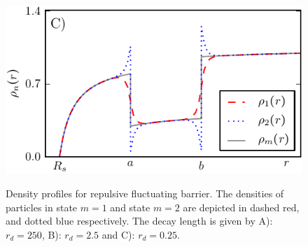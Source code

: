 \begin{minipage}[t]{0.5 \textwidth}
    \begin{figure}[H]
        \includegraphics[width = 1 \textwidth]{plots/d3.pdf}
    \end{figure}
\end{minipage}\hspace{0.07\textwidth}\begin{minipage}[t]{0.43 \textwidth}
    \begin{figure}[H]
        \caption{Density profiles for repulsive fluctuating barrier. The densities of particles in state $m=1$ and state $m=2$ are depicted in dashed red, and dotted blue respectively. The decay length is given by A): $r_d = 250$, \newline B): $r_d=2.5$ and C): $r_d=0.25$. \label{rsd}}
    \end{figure}
\end{minipage}


